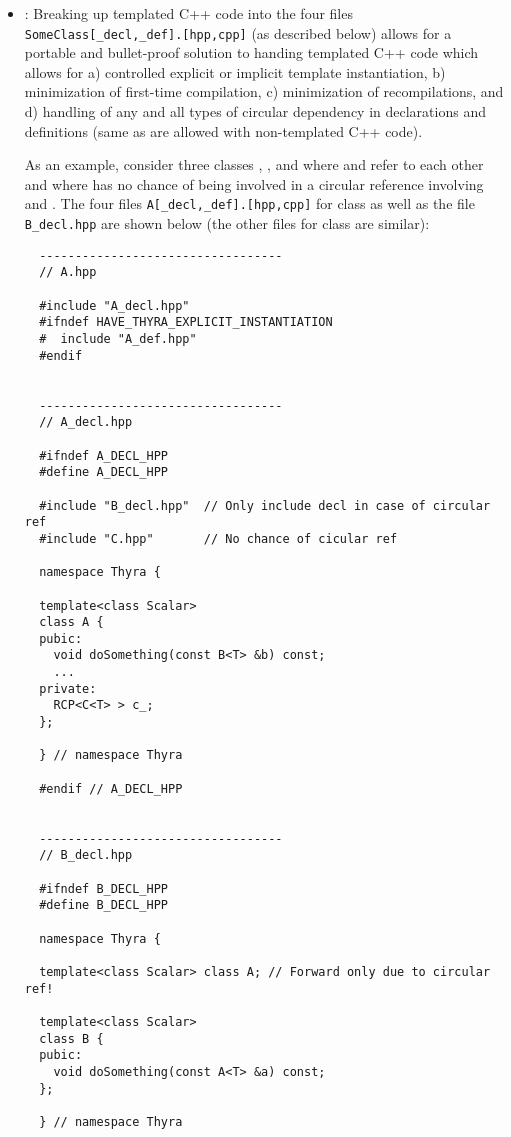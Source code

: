\begin{itemize}
\item\GCGTemplateHeaders\label{gcg:template-instantation-files}:
Breaking up templated C++ code into the four files
\texttt{SomeClass[\_decl,\_def].[hpp,cpp]} (as described below)
allows for a portable and bullet-proof solution to handing templated
C++ code which allows for a) controlled explicit or implicit template
instantiation, b) minimization of first-time compilation, c)
minimization of recompilations, and d) handling of any and all types
of circular dependency in declarations and definitions (same as are
allowed with non-templated C++ code).

As an example, consider three classes , , and 
where  and  refer to each other and where  has no
chance of being involved in a circular reference involving  and
.  The four files \texttt{A[\_decl,\_def].[hpp,cpp]} for class
 as well as the file \texttt{B\_decl.hpp} are shown below (the
other files for class  are similar):


{\small\begin{verbatim}
  ----------------------------------
  // A.hpp

  #include "A_decl.hpp"
  #ifndef HAVE_THYRA_EXPLICIT_INSTANTIATION
  #  include "A_def.hpp"
  #endif


  ----------------------------------
  // A_decl.hpp

  #ifndef A_DECL_HPP
  #define A_DECL_HPP

  #include "B_decl.hpp"  // Only include decl in case of circular ref
  #include "C.hpp"       // No chance of cicular ref

  namespace Thyra {

  template<class Scalar>
  class A {
  pubic:
    void doSomething(const B<T> &b) const;
    ...
  private:
    RCP<C<T> > c_;
  };

  } // namespace Thyra

  #endif // A_DECL_HPP


  ----------------------------------
  // B_decl.hpp

  #ifndef B_DECL_HPP
  #define B_DECL_HPP

  namespace Thyra {

  template<class Scalar> class A; // Forward only due to circular ref!

  template<class Scalar>
  class B {
  pubic:
    void doSomething(const A<T> &a) const;
  };

  } // namespace Thyra


\end{verbatim}}
\end{itemize}
